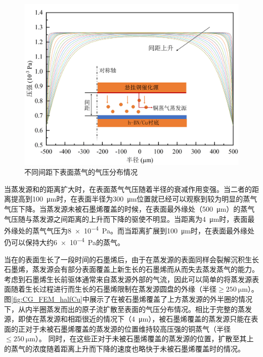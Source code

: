     \begin{figure}[htb]
        \includegraphics{pic/CG_FEM_fullCu.png}
        \caption{不同间距下表面蒸气的气压分布情况}
        \label{fig:CG_FEM_fullCu}
    \end{figure}


    当蒸发源和的距离扩大时，在表面蒸气气压随着半径的衰减作用变强。当二者的距离提高到\SI{100}{\micro\meter}时，在表面半径为\SI{300}{\micro\meter}位置就已经可以观察到较为明显的蒸气气压下降。当蒸发源未被石墨烯覆盖的时候，在表面最外缘处（\SI{500}{\micro\meter}）的蒸气气压随与蒸发源之间距离的上升而下降的驱使不明显。当距离为\SI{4}{\micro\meter}时，表面最外缘处的蒸气气压为\SI{8e-4}{\pascal}。而当距离扩展到\SI{100}{\micro\meter}时，在表面最外缘处仍可以保持大约\SI{6e-4}{\pascal}的蒸气。

    当在的表面生长了一段时间的石墨烯后，由于在蒸发源的表面同样会裂解沉积生长石墨烯，蒸发源会有部分表面覆盖上新生长的石墨烯而从而失去蒸发蒸气的能力。考虑到石墨烯生长前驱体通常来自蒸发源外部的气流，因此可以简单的将蒸发源表面随着生长过程进行而生长的石墨烯限制在蒸发源圆盘的外缘（半径$\geqslant \SI{250}{\micro\meter}$）。图\ref{fig:CG_FEM_halfCu}中展示了在被石墨烯覆盖了上方蒸发源的外半圈的情况下，从内半圈蒸发而出的原子流扩散至表面的气压分布情况。相比于完整的蒸发源，即使在蒸发源和相距很近的情况下（\SI{4}{\micro\meter}），被石墨烯覆盖的蒸发源只能在表面的正对于未被石墨烯覆盖的蒸发源的位置维持较高压强的铜蒸气（半径$\leqslant \SI{250}{\micro\meter}$）。
    同时，在这些正对于未被石墨烯覆盖的蒸发源的位置，扩散至其上的蒸气的浓度随着距离上升而下降的速度也略快于未被石墨烯覆盖时的情况。

